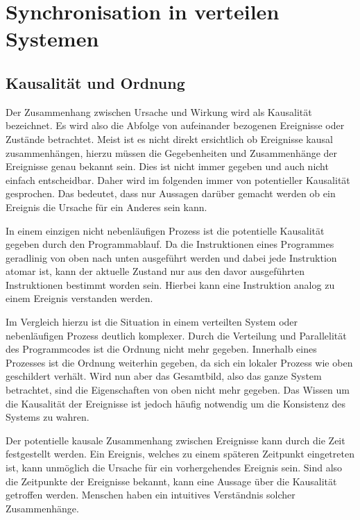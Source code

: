 \section{Synchronisation in verteilen Systemen}
\subsection{Kausalität und Ordnung}
Der Zusammenhang zwischen Ursache und Wirkung wird als Kausalität bezeichnet.
Es wird also die Abfolge von aufeinander bezogenen Ereignisse oder Zustände betrachtet.
Meist ist es nicht direkt ersichtlich ob Ereignisse kausal zusammenhängen, hierzu müssen die Gegebenheiten und Zusammenhänge der Ereignisse genau bekannt sein.
Dies ist nicht immer gegeben und auch nicht einfach entscheidbar. %
Daher wird im folgenden immer von potentieller Kausalität gesprochen.
Das bedeutet, dass nur Aussagen darüber gemacht werden ob ein Ereignis die Ursache für ein Anderes sein kann.

In einem einzigen nicht nebenläufigen Prozess ist die potentielle Kausalität gegeben durch den Programmablauf.
Da die Instruktionen eines Programmes geradlinig von oben nach unten ausgeführt werden und dabei jede Instruktion atomar ist, kann der aktuelle Zustand nur aus den davor ausgeführten Instruktionen bestimmt worden sein.
Hierbei kann eine Instruktion analog zu einem Ereignis verstanden werden.

Im Vergleich hierzu ist die Situation in einem verteilten System oder nebenläufigen Prozess deutlich komplexer.
Durch die Verteilung und Parallelität des Programmcodes ist die  Ordnung nicht mehr gegeben.
Innerhalb eines Prozesses ist die Ordnung weiterhin gegeben, da sich ein lokaler Prozess wie oben geschildert verhält.
Wird nun aber das Gesamtbild, also das ganze System betrachtet, sind die Eigenschaften von oben nicht mehr gegeben.
Das Wissen um die Kausalität der Ereignisse ist jedoch häufig notwendig um die Konsistenz des Systems zu wahren.

Der potentielle kausale Zusammenhang zwischen Ereignisse kann durch die Zeit festgestellt werden.
Ein Ereignis, welches zu einem späteren Zeitpunkt eingetreten ist, kann unmöglich die Ursache für ein vorhergehendes Ereignis sein.
Sind also die Zeitpunkte der Ereignisse bekannt, kann eine Aussage über die Kausalität getroffen werden.
Menschen haben ein intuitives Verständnis solcher Zusammenhänge.

